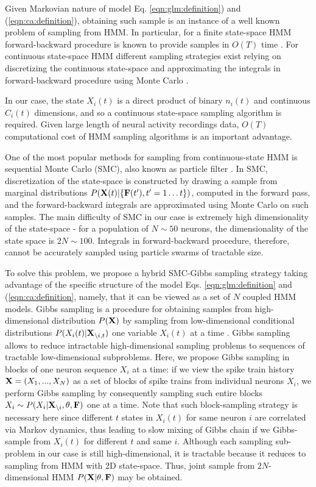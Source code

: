 Given Markovian nature of model Eq. \eqref{eqn:glm:definition}) and (\ref{eqn:ca:definition}), obtaining such sample is an instance of a well known problem of sampling from HMM. In particular, for a finite state-space HMM forward-backward procedure is known to provide samples in  $O(T)$ time \cite{RAB89}. For continuous state-space HMM different sampling strategies exist relying on discretizing the continuous state-space and approximating the integrals in forward-backward procedure using Monte Carlo \cite{DFG01, MINKAPHD, Fearnhead2003, koyama08, Andrieu2007, NBR03}.

In our case, the state $X_i(t)$ is a direct product of binary $n_i(t)$ and continuous $C_i(t)$ dimensions, and so a continuous state-space sampling algorithm is required.
Given large length of neural activity recordings data, $O(T)$ computational cost of HMM sampling algorithms is an important advantage.

One of the most popular methods for sampling from continuous-state HMM is sequential Monte Carlo (SMC), also known as particle filter \cite{DFG01}. In SMC, discretization of the state-space is constructed by drawing a sample from marginal distributions  $P({\bf X}(t)|\{{\bf F}(t'), t'=1\ldots t\})$, computed in the forward pass, and the forward-backward integrals are approximated using Monte Carlo on such samples. The main difficulty of SMC in our case is extremely high dimensionality of the state-space - for a population of $N\sim 50$ neurons, the dimensionality of the state space is $2N\sim 100$. Integrals in forward-backward procedure, therefore, cannot be accurately sampled using particle swarms of tractable size.

To solve this problem, we propose a hybrid SMC-Gibbs sampling strategy taking advantage of the specific structure of the model Eqs. \eqref{eqn:glm:definition} and (\ref{eqn:ca:definition}, namely, that it can be viewed as a set of $N$ coupled HMM models. Gibbs sampling is a procedure for obtaining samples from high-dimensional distribution $P({\bf X})$ by sampling from low-dimensional conditional distributions $P(X_{i}(t)|{\bf X}_{\backslash i, t})$ one variable $X_{i}(t)$ at a time \cite{Gelfand1990}.  Gibbs sampling allows to reduce intractable high-dimensional sampling problems to sequences of tractable low-dimensional subproblems.  Here, we propose Gibbs sampling in blocks of one neuron sequence $X_{i}$ at a time: if we view the spike train history ${\bf X}=(X_1, ..., X_N)$ as a set of blocks of spike trains from individual neurons $X_i$, we perform Gibbs sampling by consequently sampling such entire blocks $X_i\sim P(X_{i}|{\bf X}_{\backslash i}, \mathbf{\theta}, {\bf F})$ one at a time.  Note that such block-sampling strategy is necessary here since different $t$ states in $X_i(t)$ for same neuron $i$ are correlated via Markov dynamics, thus leading to slow mixing of Gibbs chain if we Gibbs-sample from $X_i(t)$ for different $t$ and same $i$.  Although each sampling sub-problem in our case is still high-dimensional, it is tractable because it reduces to sampling from HMM with 2D state-space. Thus, joint sample from $2N$-dimensional HMM $P({\bf X}|\mathbf{\theta}, {\bf F})$ may be obtained.

